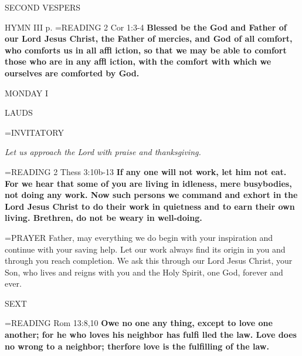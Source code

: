 \begin{flushleft}\normalsize SECOND VESPERS\\\end{flushleft}

HYMN III p. \pageref{ordinaryTime:thirdHymn}
\hangindent=\parindent \small{READING} 2 Cor 1:3-4 \textbf{Blessed be the God and Father of our Lord Jesus Christ, the Father of mercies, and God of all comfort, who comforts us in all affl iction, so that we may be able to comfort those who are in any affl iction, with the comfort with which we ourselves are comforted by God.\\}

\begin{center}
\normalsize MONDAY I
\end{center}

\begin{flushleft}\normalsize LAUDS\\\end{flushleft}

\hangindent=\parindent \small{INVITATORY}
\begin{center}
\textit{Let us approach the Lord with praise and thanksgiving.\\}
\end{center}

\hangindent=\parindent \small{READING} 2 Thess 3:10b-13 \textbf{If any one will not work, let him not eat. For we hear that some of you are living in idleness, mere busybodies, not doing any work. Now such persons we command and exhort in the Lord Jesus Christ to do their work in quietness and to earn their own living. Brethren, do not be weary in well-doing.\\}

\hangindent=\parindent \small{PRAYER  Father, may everything we do begin with your inspiration and continue with your saving help. Let our work always find its origin in you and through you reach completion. We ask this through our Lord Jesus Christ, your Son, who lives and reigns with you and the Holy Spirit, one God, forever and ever.}

\begin{flushleft}\normalsize SEXT\\\end{flushleft}

\hangindent=\parindent \small{READING} Rom 13:8,10 \textbf{Owe no one any thing, except to love one another; for he who loves his neighbor has fulfi lled the law. Love does no wrong to a neighbor; therfore love is the fulfilling of the law.}

